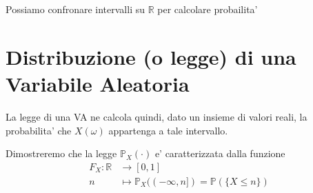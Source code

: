    Possiamo confronare intervalli su $ \mathbb{R} $ per calcolare probailita'

 \section{Distribuzione (o legge) di una Variabile Aleatoria}


 La legge di una VA ne calcola quindi, dato un insieme di valori reali, la probabilita' che $ X(\omega) $ appartenga a tale intervallo.


 Dimostreremo che la legge $ \mathbb{P}_X(\cdot) $ e' caratterizzata dalla funzione
  \begin{align*}
    F_X: \mathbb{R} &\to [0,1]\\
    n &\mapsto \mathbb{P}_X((-\infty, n]) = \mathbb{P}(\{X \leq n\})
  \end{align*}
% 
